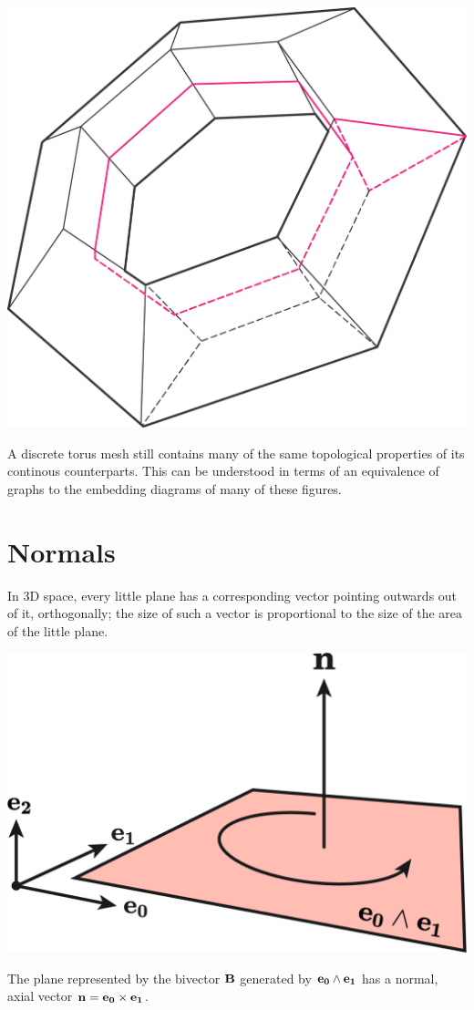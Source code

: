 \begin{marginfigure}
    \centering
    \includegraphics[width=0.8\linewidth]{images/donuttopology.png}
    \caption{A discrete torus mesh still contains many of the same topological
    properties of its continous counterparts. This can be understood in terms
    of an equivalence of graphs to the embedding diagrams of many of these figures.}
\end{marginfigure}

\section{Normals}

In 3D space, every little plane has a corresponding vector pointing
outwards out of it, orthogonally; the size of such a vector is proportional
to the size of the area of the little plane.

\begin{marginfigure}
    \centering
    \includegraphics[width=0.7\linewidth]{images/bivectornormal.png}
    \caption{The plane represented by the bivector $\bf{B}$ generated
    by $\bf{e_0\wedge e_1}$ has a normal, axial vector 
    $\bf{n = e_0 \times e_1}$.}
\end{marginfigure}

